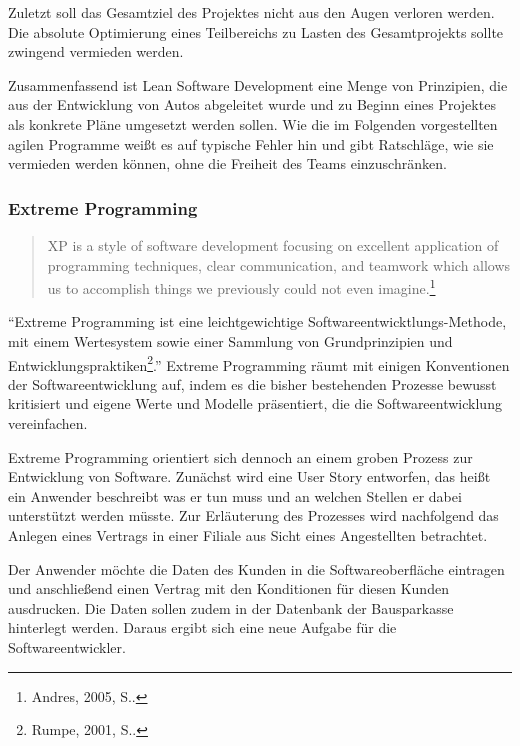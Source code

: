                Zuletzt soll das Gesamtziel des Projektes nicht aus den Augen verloren werden. Die absolute Optimierung eines Teilbereichs zu Lasten des Gesamtprojekts sollte zwingend vermieden werden.

                Zusammenfassend ist Lean Software Development eine Menge von Prinzipien, die aus der Entwicklung von Autos abgeleitet wurde und zu Beginn eines Projektes als konkrete Pläne umgesetzt werden sollen. Wie die im Folgenden vorgestellten agilen Programme weißt es auf typische Fehler hin und gibt Ratschläge, wie sie vermieden werden können, ohne die Freiheit des Teams einzuschränken.

            \subsubsection{Extreme Programming}

                \begin{quote}
                  XP is a style of software development focusing on excellent application of programming techniques, clear communication, and teamwork which allows us to accomplish things we previously could not even imagine.\footnote{Andres, 2005, S..}
                \end{quote}

                \enquote{Extreme Programming ist eine leichtgewichtige Softwareentwicktlungs-Methode, mit einem Wertesystem sowie einer Sammlung von Grundprinzipien und Entwicklungspraktiken\footnote{Rumpe, 2001, S..}.}
                Extreme Programming räumt mit einigen Konventionen der Softwareentwicklung auf, indem es die bisher bestehenden Prozesse bewusst kritisiert und eigene Werte und Modelle präsentiert, die die Softwareentwicklung vereinfachen.

                Extreme Programming orientiert sich dennoch an einem groben Prozess zur Entwicklung von Software. Zunächst wird eine User Story entworfen, das heißt ein Anwender beschreibt was er tun muss und an welchen Stellen er dabei unterstützt werden müsste. Zur Erläuterung des Prozesses wird nachfolgend das Anlegen eines Vertrags in einer Filiale aus Sicht eines Angestellten betrachtet.

                Der Anwender möchte die Daten des Kunden in die Softwareoberfläche eintragen und anschließend einen Vertrag mit den Konditionen für diesen Kunden ausdrucken. Die Daten sollen zudem in der Datenbank der Bausparkasse hinterlegt werden. Daraus ergibt sich eine neue Aufgabe für die Softwareentwickler.

